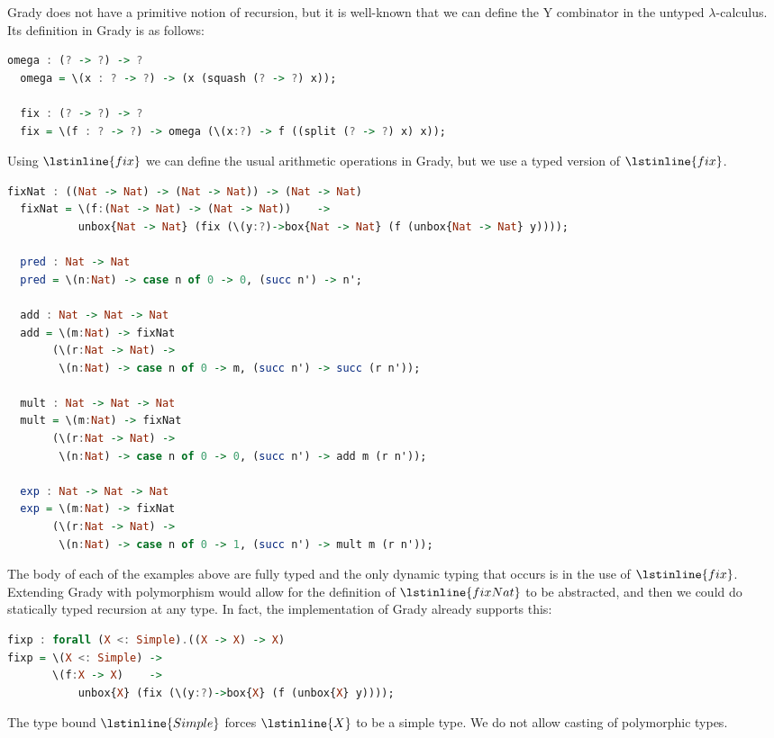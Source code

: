 Grady does not have a primitive notion of recursion, but it is
well-known that we can define the Y combinator in the untyped
$\lambda$-calculus.  Its definition in Grady is as follows:
\begin{lstlisting}[language=Haskell]
  omega : (? -> ?) -> ?
  omega = \(x : ? -> ?) -> (x (squash (? -> ?) x));
  
  fix : (? -> ?) -> ?
  fix = \(f : ? -> ?) -> omega (\(x:?) -> f ((split (? -> ?) x) x));
\end{lstlisting}
Using $\lstinline{fix}$ we can define the usual arithmetic operations
in Grady, but we use a typed version of $\lstinline{fix}$.
\begin{lstlisting}[language=Haskell]
  fixNat : ((Nat -> Nat) -> (Nat -> Nat)) -> (Nat -> Nat)
  fixNat = \(f:(Nat -> Nat) -> (Nat -> Nat))    ->
           unbox{Nat -> Nat} (fix (\(y:?)->box{Nat -> Nat} (f (unbox{Nat -> Nat} y))));
  
  pred : Nat -> Nat
  pred = \(n:Nat) -> case n of 0 -> 0, (succ n') -> n';

  add : Nat -> Nat -> Nat
  add = \(m:Nat) -> fixNat
       (\(r:Nat -> Nat) ->
        \(n:Nat) -> case n of 0 -> m, (succ n') -> succ (r n'));
  
  mult : Nat -> Nat -> Nat
  mult = \(m:Nat) -> fixNat
       (\(r:Nat -> Nat) ->
        \(n:Nat) -> case n of 0 -> 0, (succ n') -> add m (r n'));

  exp : Nat -> Nat -> Nat
  exp = \(m:Nat) -> fixNat
       (\(r:Nat -> Nat) ->
        \(n:Nat) -> case n of 0 -> 1, (succ n') -> mult m (r n'));
\end{lstlisting}
The body of each of the examples above are fully typed and the only
dynamic typing that occurs is in the use of $\lstinline{fix}$.
Extending Grady with polymorphism would allow for the definition of
$\lstinline{fixNat}$ to be abstracted, and then we could do statically
typed recursion at any type.  In fact, the implementation of Grady
already supports this:
\begin{lstlisting}[language=Haskell]
fixp : forall (X <: Simple).((X -> X) -> X)
fixp = \(X <: Simple) ->
       \(f:X -> X)    ->
           unbox{X} (fix (\(y:?)->box{X} (f (unbox{X} y))));
\end{lstlisting}
The type bound $\lstinline{Simple}$ forces $\lstinline{X}$ to be a
simple type.  We do not allow casting of polymorphic types.

